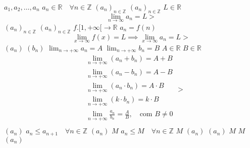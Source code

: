 \documentclass{article}
\begin{document}
$a_1, a_2, \dots, a_n$
$a_n \in \mathbb{R} \quad \forall n \in \mathbb{Z}$
$(a_n)_{n\in\mathbb{Z}}$
$(a_n)_{n\in\mathbb{Z}}$
$L \in \mathbb{R}$
$$
  \lim_{n \to \infty} a_n = L
>$$
$(a_n)_{n\in\mathbb{Z}}$
$(a_n)_{n \in \mathbb{Z}}$
$f.[1, +\infty[ \to \mathbb{R}$
$a_n = f(n)$
$$
  \lim_{x \to \infty} f(x) = L \implies \lim_{x \to \infty} a_n = L
>$$
$(a_n)$
$(b_n)$
$\lim_{n \to +\infty} a_n = A$
$\lim_{n \to +\infty} b_n = B$
$A \in \mathbb{R}$
$B \in \mathbb{R}$
$$
\begin{aligned}
  &\lim_{n \to + \infty}(a_n + b_n) = A + B\\
  &\lim_{n \to + \infty}(a_n - b_n) = A - B\\
  &\lim_{n \to + \infty}(a_n \cdot b_n) = A \cdot B\\
  &\lim_{n \to + \infty}(k \cdot b_n) = k \cdot B\\
  &\lim_{n \to + \infty} \frac{a_n}{b_n} = \frac{A}{B}, \quad \text{com } B \neq 0\\
\end{aligned}
>$$
$(a_n)$
$a_n \leq a_{n+1} \quad \forall n \in \mathbb{Z}$
$(a_n)$
$M$
$a_n \leq M \quad \forall n \in \mathbb{Z}$
$M$
$(a_n)$
$(a_n)$
$M$
$M$
$(a_n)$
\end{document}
